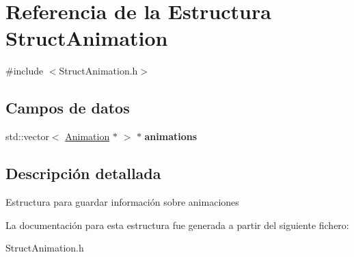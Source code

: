\hypertarget{structStructAnimation}{}\section{Referencia de la Estructura Struct\+Animation}
\label{structStructAnimation}


{\ttfamily \#include $<$Struct\+Animation.\+h$>$}

\subsection*{Campos de datos}
\begin{DoxyCompactItemize}
\item 
\hypertarget{structStructAnimation_a0373170e287c41c66499d16d1dd6e317}{}std\+::vector$<$ \hyperlink{classAnimation}{Animation} $\ast$ $>$ $\ast$ {\bfseries animations}\label{structStructAnimation_a0373170e287c41c66499d16d1dd6e317}

\end{DoxyCompactItemize}


\subsection{Descripción detallada}
Estructura para guardar información sobre animaciones 

La documentación para esta estructura fue generada a partir del siguiente fichero\+:\begin{DoxyCompactItemize}
\item 
Struct\+Animation.\+h\end{DoxyCompactItemize}
